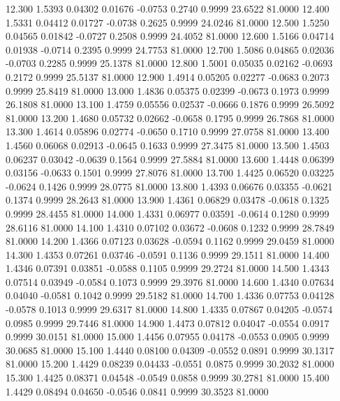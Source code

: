   12.300   1.5393   0.04302   0.01676  -0.0753   0.2740   0.9999  23.6522  81.0000
  12.400   1.5331   0.04412   0.01727  -0.0738   0.2625   0.9999  24.0246  81.0000
  12.500   1.5250   0.04565   0.01842  -0.0727   0.2508   0.9999  24.4052  81.0000
  12.600   1.5166   0.04714   0.01938  -0.0714   0.2395   0.9999  24.7753  81.0000
  12.700   1.5086   0.04865   0.02036  -0.0703   0.2285   0.9999  25.1378  81.0000
  12.800   1.5001   0.05035   0.02162  -0.0693   0.2172   0.9999  25.5137  81.0000
  12.900   1.4914   0.05205   0.02277  -0.0683   0.2073   0.9999  25.8419  81.0000
  13.000   1.4836   0.05375   0.02399  -0.0673   0.1973   0.9999  26.1808  81.0000
  13.100   1.4759   0.05556   0.02537  -0.0666   0.1876   0.9999  26.5092  81.0000
  13.200   1.4680   0.05732   0.02662  -0.0658   0.1795   0.9999  26.7868  81.0000
  13.300   1.4614   0.05896   0.02774  -0.0650   0.1710   0.9999  27.0758  81.0000
  13.400   1.4560   0.06068   0.02913  -0.0645   0.1633   0.9999  27.3475  81.0000
  13.500   1.4503   0.06237   0.03042  -0.0639   0.1564   0.9999  27.5884  81.0000
  13.600   1.4448   0.06399   0.03156  -0.0633   0.1501   0.9999  27.8076  81.0000
  13.700   1.4425   0.06520   0.03225  -0.0624   0.1426   0.9999  28.0775  81.0000
  13.800   1.4393   0.06676   0.03355  -0.0621   0.1374   0.9999  28.2643  81.0000
  13.900   1.4361   0.06829   0.03478  -0.0618   0.1325   0.9999  28.4455  81.0000
  14.000   1.4331   0.06977   0.03591  -0.0614   0.1280   0.9999  28.6116  81.0000
  14.100   1.4310   0.07102   0.03672  -0.0608   0.1232   0.9999  28.7849  81.0000
  14.200   1.4366   0.07123   0.03628  -0.0594   0.1162   0.9999  29.0459  81.0000
  14.300   1.4353   0.07261   0.03746  -0.0591   0.1136   0.9999  29.1511  81.0000
  14.400   1.4346   0.07391   0.03851  -0.0588   0.1105   0.9999  29.2724  81.0000
  14.500   1.4343   0.07514   0.03949  -0.0584   0.1073   0.9999  29.3976  81.0000
  14.600   1.4340   0.07634   0.04040  -0.0581   0.1042   0.9999  29.5182  81.0000
  14.700   1.4336   0.07753   0.04128  -0.0578   0.1013   0.9999  29.6317  81.0000
  14.800   1.4335   0.07867   0.04205  -0.0574   0.0985   0.9999  29.7446  81.0000
  14.900   1.4473   0.07812   0.04047  -0.0554   0.0917   0.9999  30.0151  81.0000
  15.000   1.4456   0.07955   0.04178  -0.0553   0.0905   0.9999  30.0685  81.0000
  15.100   1.4440   0.08100   0.04309  -0.0552   0.0891   0.9999  30.1317  81.0000
  15.200   1.4429   0.08239   0.04433  -0.0551   0.0875   0.9999  30.2032  81.0000
  15.300   1.4425   0.08371   0.04548  -0.0549   0.0858   0.9999  30.2781  81.0000
  15.400   1.4429   0.08494   0.04650  -0.0546   0.0841   0.9999  30.3523  81.0000
